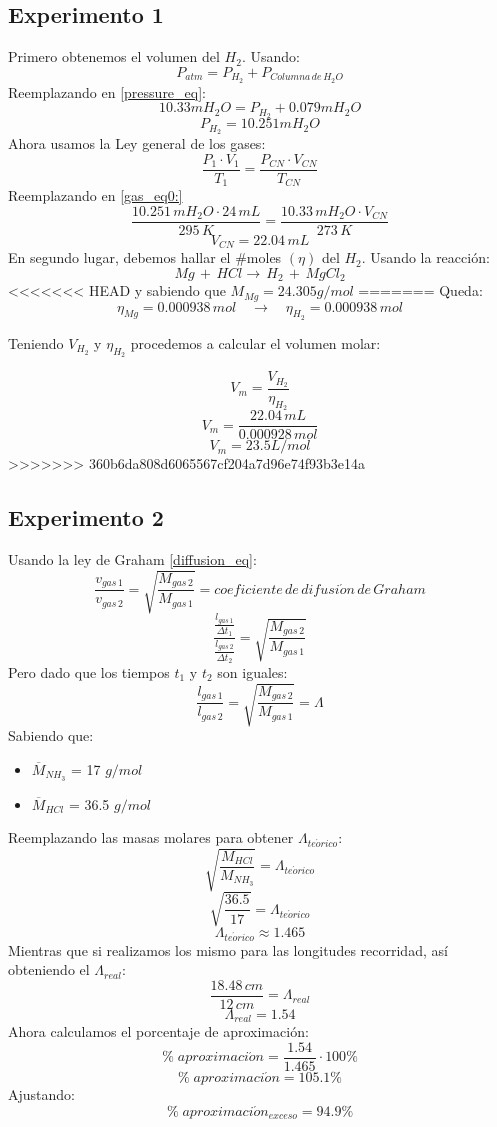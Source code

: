 \documentclass[../main.tex]{subfiles}
\begin{document}
\subsection{Experimento 1}
Primero obtenemos el volumen del $H_2$.
Usando:
\begin{equation} \label{pressure_eq}
    P_{atm} = P_{H_2} + P_{Columna \, de \, H_2O}
\end{equation}
Reemplazando en \ref{pressure_eq}:
\[ 10.33mH_2O = P_{H_2} + 0.079mH_2O \]
\[ P_{H_2} = 10.251mH_2O \]
Ahora usamos la Ley general de los gases:
\begin{equation} \label{gas_eq}
    \frac{P_1 \cdot V_1}{T_1} = \frac{P_{CN} \cdot V_{CN}}{T_{CN}}
\end{equation}
Reemplazando en \ref{gas_eq0:}
\[
    \frac{10.251 \, mH_2O \cdot 24 \, mL}{295 \, K} =
    \frac{10.33 \, mH_2O \cdot V_{CN}}{273 \, K}
\]
\[ V_{CN} = 22.04 \, mL\]
En segundo lugar, debemos hallar el $\#$moles $(\eta)$ del $H_2$.
Usando la reacción:
\[ Mg \, + \, HCl \rightarrow \, H_2 \, + \, MgCl_2 \]
<<<<<<< HEAD
y sabiendo que $M_{Mg} = 24.305 g/mol$
=======
Queda:
\[\eta_{Mg} = 0.000938 \, mol \quad \rightarrow \quad \eta_{H_2} = 0.000938 \,mol\]

Teniendo $V_{H_2}$ y $\eta_{H_2}$ procedemos a calcular el volumen molar:

\[V_m = \frac{V_{H_2}}{\eta_{H_2}}\]
\[V_m = \frac{22.04 \, mL}{0.000928 \, mol}\]
\[V_m = 23.5 L/mol\]
>>>>>>> 360b6da808d6065567cf204a7d96e74f93b3e14a

\subsection{Experimento 2}

Usando la ley de Graham \ref{diffusion_eq}:
\begin{equation}
    \frac{v_{gas\, 1}}{v_{gas\, 2}} =
    \sqrt{\frac{M_{gas\, 2}}{M_{gas\, 1}}} =
    coeficiente \, de \, difusi\acute{o}n \, de \, Graham
\end{equation}
\[
    \frac{\frac{l_{gas\, 1}}{\Delta t_1}}{\frac{l_{gas\, 2}}{\Delta t_2}} =
    \sqrt{\frac{M_{gas\, 2}}{M_{gas\, 1}}} 
\]
Pero dado que los tiempos $t_1$ y $t_2$ son iguales:
\[
    \frac{l_{gas\, 1}}{l_{gas\, 2}} =
    \sqrt{\frac{M_{gas\, 2}}{M_{gas\, 1}}} =
    \Lambda
\]
Sabiendo que:
\begin{itemize}
    \item $\overline{M}_{NH_3}$ = 17 $g/mol$
    \item $\overline{M}_{HCl}$  = 36.5 $g/mol$
\end{itemize}
Reemplazando las masas molares para obtener $\Lambda_{te\acute{o}rico}$:
\[
    \sqrt{\frac{M_{HCl}}{M_{NH_3}}} =
    \Lambda_{te\acute{o}rico}
\]
\[
    \sqrt{\frac{36.5}{17}} =
    \Lambda_{te\acute{o}rico}
\]
\[ \Lambda_{te\acute{o}rico} \approx 1.465 \]
Mientras que si realizamos los mismo para las longitudes recorridad, así 
obteniendo el $\Lambda_{real}$:
\[
    \frac{18.48 \, cm}{12 \, cm} =
    \Lambda_{real}
\]
\[ \Lambda_{real} = 1.54\]
Ahora calculamos el porcentaje de aproximación:
\[ \% \; aproximaci\acute{o}n = \frac{1.54}{1.465} \cdot 100\%\]    
\[ \% \; aproximaci\acute{o}n = 105.1\%\]
Ajustando:
\[ \% \; aproximaci\acute{o}n_{exceso} = 94.9\%\]
\end{document}
